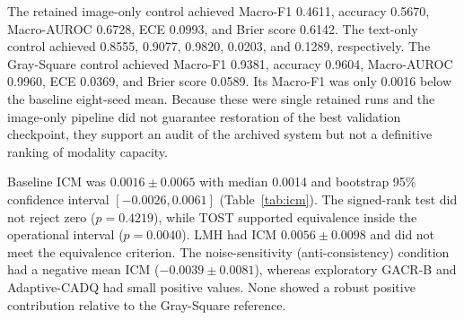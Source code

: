\documentclass[a4paper,fleqn]{cas-sc}
\begin{document}
The retained image-only control achieved Macro-F1 0.4611, accuracy 0.5670,
Macro-AUROC 0.6728, ECE 0.0993, and Brier score 0.6142. The text-only control
achieved 0.8555, 0.9077, 0.9820, 0.0203, and 0.1289, respectively. The
Gray-Square control achieved Macro-F1 0.9381, accuracy 0.9604, Macro-AUROC
0.9960, ECE 0.0369, and Brier score 0.0589. Its Macro-F1 was only 0.0016 below
the baseline eight-seed mean. Because these were single retained runs and the
image-only pipeline did not guarantee restoration of the best validation
checkpoint, they support an audit of
the archived system but not a definitive ranking of modality capacity.

Baseline ICM was $0.0016\pm0.0065$ with median 0.0014 and bootstrap 95\%
confidence interval $[-0.0026,0.0061]$ (Table~\ref{tab:icm}). The signed-rank
test did not reject zero ($p=0.4219$), while TOST supported equivalence inside
the operational interval ($p=0.0040$). LMH had ICM $0.0056\pm0.0098$ and did
not meet the equivalence criterion. The noise-sensitivity (anti-consistency)
condition had a negative mean ICM ($-0.0039\pm0.0081$), whereas exploratory
GACR-B and Adaptive-CADQ had small
positive values. None showed a robust positive contribution relative to the
Gray-Square reference.

\begin{table}[pos=htbp]
\centering
\caption{Image Contribution Metric statistics over eight seeds. Confidence
intervals are percentile bootstrap intervals from 2,000 resamples. Wilcoxon
tests compare ICM with zero; TOST evaluates equivalence within the operational
interval $[-0.01,0.01]$.}
\label{tab:icm}
\scriptsize
{}
\end{table}
\end{document}
